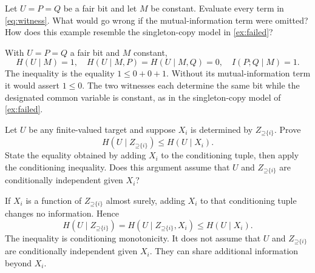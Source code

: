 \documentclass[11pt]{article}
\newcommand{\Up}{\mathord{\supseteq}}
\begin{document}
\begin{exercise}
\label{ex:dependence}\important
Let $U=P=Q$ be a fair bit and let $M$ be constant. Evaluate every term in
\eqref{eq:witness}. What would go wrong if the mutual-information term were
omitted? How does this example resemble the singleton-copy model in \cref{ex:failed}?
\end{exercise}
\begin{solution}[ex:dependence]
With $U=P=Q$ a fair bit and $M$ constant,
\[
 H(U\mid M)=1,\quad H(U\mid M,P)=H(U\mid M,Q)=0,
 \quad I(P;Q\mid M)=1.
\]
The inequality is the equality $1\le0+0+1$. Without its mutual-information
term it would assert $1\le0$. The two witnesses each determine the same bit while
the designated common variable is constant, as in the singleton-copy model
of \cref{ex:failed}.
\end{solution}

\begin{exercise}
\label{ex:transfer}\important
Let $U$ be any finite-valued target and suppose $X_i$ is determined by
$Z_{\Up\{i\}}$. Prove
\[
 H(U\mid Z_{\Up\{i\}})\le H(U\mid X_i).
\]
State the equality obtained by adding $X_i$ to the conditioning tuple, then
apply the conditioning inequality. Does this argument assume that $U$ and
$Z_{\Up\{i\}}$ are conditionally independent given $X_i$?
\end{exercise}
\begin{solution}[ex:transfer]
If $X_i$ is a function of $Z_{\Up\{i\}}$ almost surely, adding $X_i$ to
that conditioning tuple changes no information. Hence
\[
 H(U\mid Z_{\Up\{i\}})
 =H(U\mid Z_{\Up\{i\}},X_i)
 \le H(U\mid X_i).
\]
The inequality is conditioning monotonicity. It does not assume that $U$ and
$Z_{\Up\{i\}}$ are conditionally independent given $X_i$. They can share
additional information beyond $X_i$.
\end{solution}
\end{document}
